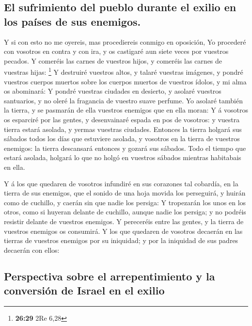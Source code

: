 \hypertarget{el-sufrimiento-del-pueblo-durante-el-exilio-en-los-pauxedses-de-sus-enemigos.}{%
\subsection{El sufrimiento del pueblo durante el exilio en los países de
sus
enemigos.}\label{el-sufrimiento-del-pueblo-durante-el-exilio-en-los-pauxedses-de-sus-enemigos.}}

 Y si con esto no me oyereis, mas procediereis conmigo en
oposición,  Yo procederé con vosotros en contra y con
ira, y os castigaré aun siete veces por vuestros pecados.
 Y comeréis las carnes de vuestros hijos, y comeréis las
carnes de vuestras hijas: \footnote{\textbf{26:29} 2Re 6,28}
 Y destruiré vuestros altos, y talaré vuestras imágenes,
y pondré vuestros cuerpos muertos sobre los cuerpos muertos de vuestros
ídolos, y mi alma os abominará:  Y pondré vuestras
ciudades en desierto, y asolaré vuestros santuarios, y no oleré la
fragancia de vuestro suave perfume.  Yo asolaré también
la tierra, y se pasmarán de ella vuestros enemigos que en ella moran:
 Y á vosotros os esparciré por las gentes, y desenvainaré
espada en pos de vosotros: y vuestra tierra estará asolada, y yermas
vuestras ciudades.  Entonces la tierra holgará sus
sábados todos los días que estuviere asolada, y vosotros en la tierra de
vuestros enemigos: la tierra descansará entonces y gozará sus sábados.
 Todo el tiempo que estará asolada, holgará lo que no
holgó en vuestros sábados mientras habitabais en ella.

 Y á los que quedaren de vosotros infundiré en sus
corazones tal cobardía, en la tierra de sus enemigos, que el sonido de
una hoja movida los perseguirá, y huirán como de cuchillo, y caerán sin
que nadie los persiga:  Y tropezarán los unos en los
otros, como si huyeran delante de cuchillo, aunque nadie los persiga; y
no podréis resistir delante de vuestros enemigos.  Y
pereceréis entre las gentes, y la tierra de vuestros enemigos os
consumirá.  Y los que quedaren de vosotros decaerán en
las tierras de vuestros enemigos por su iniquidad; y por la iniquidad de
sus padres decaerán con ellos:

\hypertarget{perspectiva-sobre-el-arrepentimiento-y-la-conversiuxf3n-de-israel-en-el-exilio}{%
\subsection{Perspectiva sobre el arrepentimiento y la conversión de
Israel en el
exilio}\label{perspectiva-sobre-el-arrepentimiento-y-la-conversiuxf3n-de-israel-en-el-exilio}}

